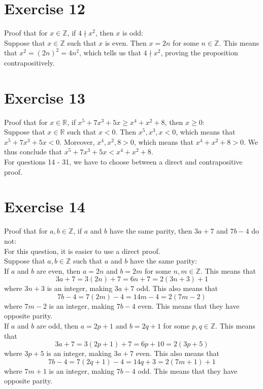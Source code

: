 \documentclass[12pt]{article}
\newcommand{\Z}{\mathbb{Z}}
\newcommand{\R}{\mathbb{R}}
\begin{document}
    \section*{Exercise 12}
    Proof that for $x \in \Z$,
    if $4 \nmid x^2$,
    then $x$ is odd: \\
    Suppose that $x \in \Z$
    such that $x$ is even.
    Then $x = 2n$ for some $n \in \Z$.
    This means that $x^2 = (2n)^2 = 4n^2$,
    which tells us that $4 \nmid x^2$,
    proving the proposition contrapositively. \\

    \section*{Exercise 13}
    Proof that for $x \in \R$,
    if $x^5 + 7x^3 + 5x \geqslant x^4 + x^2 + 8$,
    then $x \geqslant 0$: \\
    Suppose that $x \in \R$
    such that $x < 0$.
    Then $x^5, x^3, x < 0$,
    which means that $x^5 + 7x^3 + 5x < 0$.
    Moreover,
    $x^4, x^2, 8 > 0$,
    which means that $x^4 + x^2 + 8 > 0$.
    We thus conclude that $x^5 + 7x^3 + 5x < x^4 + x^2 + 8$. \\

    For questions 14 - 31, we have to choose between a direct
    and contrapositive proof. \\

    \section*{Exercise 14}
    Proof that for $a, b \in \Z$,
    if $a$ and $b$ have the same parity,
    then $3a + 7$ and $7b - 4$ do not: \\
    For this question, it is easier to use a direct proof. \\
    Suppose that $a, b \in \Z$
    such that $a$ and $b$ have the same parity: \\
    If $a$ and $b$ are even,
    then $a = 2n$ and $b = 2m$ for some $n, m \in \Z$.
    This means that
    \[ 3a + 7 = 3(2n) + 7 = 6n + 7 = 2(3n + 3) + 1 \]
    where $3n + 3$ is an integer,
    making $3a + 7$ odd.
    This also means that
    \[ 7b - 4 = 7(2m) - 4 = 14m - 4 = 2(7m - 2) \]
    where $7m - 2$ is an integer,
    making $7b - 4$ even.
    This means that they have opposite parity. \\
    If $a$ and $b$ are odd,
    then $a = 2p + 1$ and $b = 2q + 1$ for some $p, q \in \Z$.
    This means that
    \[ 3a + 7 = 3(2p + 1) + 7 = 6p + 10 = 2(3p + 5) \]
    where $3p + 5$ is an integer,
    making $3a + 7$ even.
    This also means that
    \[ 7b - 4 = 7(2q + 1) - 4 = 14q + 3 = 2(7m + 1) + 1 \]
    where $7m + 1$ is an integer,
    making $7b - 4$ odd.
    This means that they have opposite parity. \\
\end{document}
